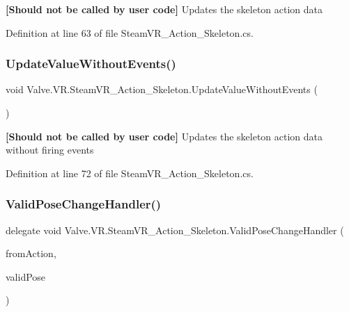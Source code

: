 {\bfseries{\mbox{[}Should not be called by user code\mbox{]}}} Updates the skeleton action data 



Definition at line 63 of file Steam\+V\+R\+\_\+\+Action\+\_\+\+Skeleton.\+cs.

\mbox{\label{class_valve_1_1_v_r_1_1_steam_v_r___action___skeleton_af2a0c3bcaea3b4bc17cbf8f3a0d4794f}} 
\subsubsection{\texorpdfstring{UpdateValueWithoutEvents()}{UpdateValueWithoutEvents()}}
{\footnotesize\ttfamily void Valve.\+V\+R.\+Steam\+V\+R\+\_\+\+Action\+\_\+\+Skeleton.\+Update\+Value\+Without\+Events (\begin{DoxyParamCaption}{ }\end{DoxyParamCaption})}



{\bfseries{\mbox{[}Should not be called by user code\mbox{]}}} Updates the skeleton action data without firing events 



Definition at line 72 of file Steam\+V\+R\+\_\+\+Action\+\_\+\+Skeleton.\+cs.

\mbox{\label{class_valve_1_1_v_r_1_1_steam_v_r___action___skeleton_af5ad5e815b7f555aa33ee8b74385e89e}} 
\subsubsection{\texorpdfstring{ValidPoseChangeHandler()}{ValidPoseChangeHandler()}}
{\footnotesize\ttfamily delegate void Valve.\+V\+R.\+Steam\+V\+R\+\_\+\+Action\+\_\+\+Skeleton.\+Valid\+Pose\+Change\+Handler (\begin{DoxyParamCaption}\item[{\mbox{\hyperlink{class_valve_1_1_v_r_1_1_steam_v_r___action___skeleton}{Steam\+V\+R\+\_\+\+Action\+\_\+\+Skeleton}}}]{from\+Action,  }\item[{bool}]{valid\+Pose }\end{DoxyParamCaption})}



